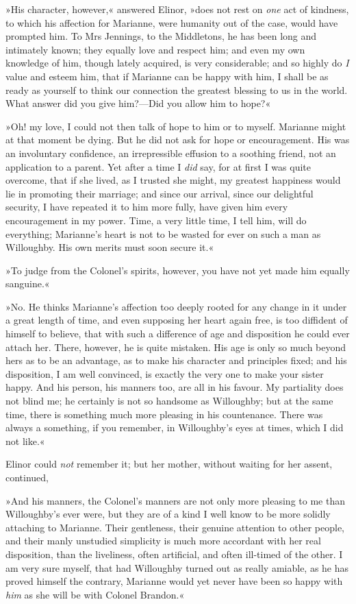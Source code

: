 »His character, however,« answered Elinor, »does not rest on \textit{one} act of kindness, to which his affection for Marianne, were humanity out of the case, would have prompted him. To Mrs Jennings, to the Middletons, he has been long and intimately known; they equally love and respect him; and even my own knowledge of him, though lately acquired, is very considerable; and so highly do \textit{I} value and esteem him, that if Marianne can be happy with him, I shall be as ready as yourself to think our connection the greatest blessing to us in the world. What answer did you give him?—Did you allow him to hope?«

»Oh! my love, I could not then talk of hope to him or to myself. Marianne might at that moment be dying. But he did not ask for hope or encouragement. His was an involuntary confidence, an irrepressible effusion to a soothing friend, not an application to a parent. Yet after a time I \textit{did} say, for at first I was quite overcome, that if she lived, as I trusted she might, my greatest happiness would lie in promoting their marriage; and since our arrival, since our delightful security, I have repeated it to him more fully, have given him every encouragement in my power. Time, a very little time, I tell him, will do everything; Marianne’s heart is not to be wasted for ever on such a man as Willoughby. His own merits must soon secure it.«

»To judge from the Colonel’s spirits, however, you have not yet made him equally sanguine.«

»No. He thinks Marianne’s affection too deeply rooted for any change in it under a great length of time, and even supposing her heart again free, is too diffident of himself to believe, that with such a difference of age and disposition he could ever attach her. There, however, he is quite mistaken. His age is only so much beyond hers as to be an advantage, as to make his character and principles fixed; and his disposition, I am well convinced, is exactly the very one to make your sister happy. And his person, his manners too, are all in his favour. My partiality does not blind me; he certainly is not so handsome as Willoughby; but at the same time, there is something much more pleasing in his countenance. There was always a something, if you remember, in Willoughby’s eyes at times, which I did not like.«

Elinor could \textit{not} remember it; but her mother, without waiting for her assent, continued,

»And his manners, the Colonel’s manners are not only more pleasing to me than Willoughby’s ever were, but they are of a kind I well know to be more solidly attaching to Marianne. Their gentleness, their genuine attention to other people, and their manly unstudied simplicity is much more accordant with her real disposition, than the liveliness, often artificial, and often ill-timed of the other. I am very sure myself, that had Willoughby turned out as really amiable, as he has proved himself the contrary, Marianne would yet never have been so happy with \textit{him} as she will be with Colonel Brandon.«

